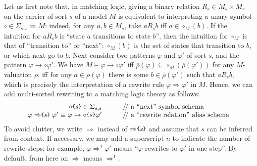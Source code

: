 \documentclass[UTF8,11pt]{article}
\theoremstyle{plain}
\theoremstyle{definition}
\theoremstyle{remark}
\newcommand{\parametric}[2]{{#1}\raisebox{.2ex}{\texttt{\footnotesize{\{}}}#2\raisebox{.2ex}{\texttt{\footnotesize{\}}}}}
\newcommand{\doubleslash}{/\!/{ }}
\newcommand{\ra}{\rightarrow}
\begin{document}
Let us first note that, in matching logic, giving a binary relation
$R_s \in M_s \times M_s$ on the carrier of sort $s$ of a model $M$
is equivalent to interpreting a unary symbol $\circ \in \Sigma_{s,s}$ in $M$:
indeed, for any $a,b\in M_s$, take $a\mathrel{R_s} b$ iff $a \in \circ_M(b)$.
If the intuition for $a \mathrel{R_s} b$ is ``state $a$ transitions to
state $b$'', then the intuition for $\circ_M$ is that of ``transition to''
or ``next'':
$\circ_M(b)$ is the set of states that transition to $b$, or which next go
to $b$.
Next consider two patterns $\varphi$ and $\varphi'$ of sort $s$, and the
pattern $\varphi \ra \circ \varphi'$.
We have $M \models \varphi \ra \circ \varphi'$ iff
$\overline{\rho}(\varphi) \subseteq \circ_M(\overline{\rho}(\varphi'))$
for any $M$-valuation $\rho$, iff for any $a\in\overline{\rho}(\varphi)$
there is some $b \in \overline{\rho}(\varphi')$ such that $a\mathrel{R_s}b$,
which is precisely the interpretation of a rewrite rule
$\varphi \Rightarrow \varphi'$ in $M$.
Hence, we can add multi-sorted rewriting to a matching logic theory
as follows:
$$
\begin{array}{r@{\hspace*{7ex}}l}
\parametric{\circ}{s} \in \Sigma_{s,s}
& \textrm{\doubleslash a ``next'' symbol schema}
\\
\varphi\mathrel{\parametric{\Rightarrow}{s}}\varphi'
\equiv \varphi \rightarrow \parametric{\circ}{s} \varphi'
& \textrm{\doubleslash a ``rewrite relation'' alias schema}
\end{array}
$$
To avoid clutter, we write $\Rightarrow$ instead of
$\parametric{\Rightarrow}{s}$ and assume that $s$ can be inferred from
context.
If necessary, we may add a superscript $n$ to indicate the number of rewrite steps;
for example, $\varphi \Rightarrow^1 \varphi'$ means
``$\varphi$ rewrites to $\varphi'$ in one step''.
By default, from here on $\Rightarrow$ means $\Rightarrow^1$.
\end{document}
